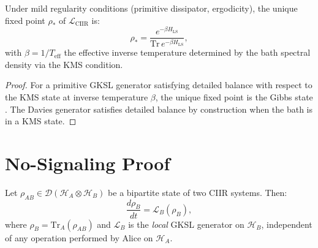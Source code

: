 \begin{proposition}
\label{prop:c9:fixedpoint}
Under mild regularity conditions (primitive dissipator, ergodicity),
the unique fixed point $\rho_*$ of $\mathcal{L}_{\mathrm{CIIR}}$ is:
\begin{equation}
  \rho_* = \frac{e^{-\beta H_{\mathrm{LS}}}}
    {\mathrm{Tr}\, e^{-\beta H_{\mathrm{LS}}}},
  \label{eq:c9:gibbs}
\end{equation}
with $\beta = 1/T_{\mathrm{eff}}$ the effective inverse temperature
determined by the bath spectral density via the KMS condition.
\end{proposition}

\begin{proof}
For a primitive GKSL generator satisfying detailed balance with respect
to the KMS state at inverse temperature $\beta$, the unique fixed point
is the Gibbs state \cite{Frigerio1978, Alicki1976}.  The Davies
generator satisfies detailed balance by construction when the bath is
in a KMS state.
\end{proof}


\section{No-Signaling Proof}
\label{sec:c9:nosignal}

\begin{theorem}
\label{thm:c9:nosignal}
Let $\rho_{AB} \in \mathcal{D}(\mathcal{H}_A \otimes \mathcal{H}_B)$
be a bipartite state of two CIIR systems.  Then:
\begin{equation}
  \frac{d\rho_B}{dt} = \mathcal{L}_B(\rho_B),
  \label{eq:c9:nosignal}
\end{equation}
where $\rho_B = \mathrm{Tr}_A(\rho_{AB})$ and $\mathcal{L}_B$ is the
\emph{local} GKSL generator on $\mathcal{H}_B$, independent of any
operation performed by Alice on $\mathcal{H}_A$.
\end{theorem}

